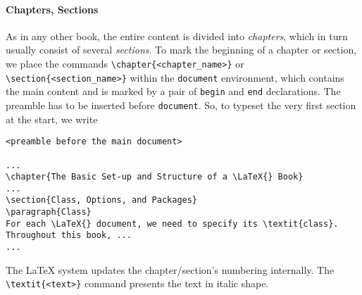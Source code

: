 \paragraph{Chapters, Sections}
As in any other book, the entire content is divided into \textit{chapters}, which in turn usually consist of several \textit{sections}. To mark the beginning of a chapter or section, we place the commands \texttt{\textbackslash chapter\{<chapter\_name>\}} or \texttt{\textbackslash section\{<section\_name>\}} within the \verb|document| environment, which contains the main content and is marked by a pair of \verb|begin| and \verb|end| declarations. The preamble has to be inserted before \verb|document|. So, to typeset the very first section at the start, we write
\begin{lstlisting}
<preamble before the main document>

...
\chapter{The Basic Set-up and Structure of a \LaTeX{} Book}
...
\section{Class, Options, and Packages}
\paragraph{Class}
For each \LaTeX{} document, we need to specify its \textit{class}. Throughout this book, ...
...

\end{lstlisting}
The \LaTeX{} system updates the chapter/section's numbering internally. The \texttt{\textbackslash textit\{<text>\}} command presents the text in italic shape.

